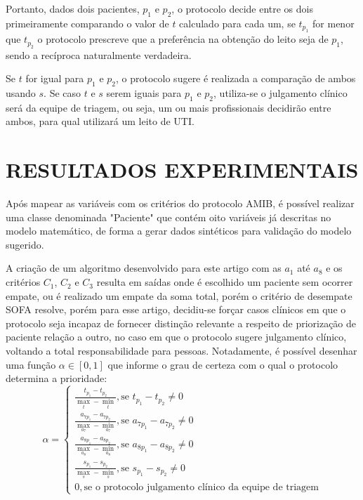 \documentclass[12pt]{article}
\begin{document}
Portanto, dados dois pacientes, $p_1$ e $p_2$, o protocolo decide entre os dois primeiramente comparando o valor de $t$ calculado para cada um, se  $t_{p_1}$ for menor que $t_{p_2}$ o protocolo prescreve que a preferência na obtenção do leito seja de $p_1$, sendo a recíproca naturalmente verdadeira.

Se $t$ for igual para $p_1$ e $p_2$, o protocolo sugere é realizada a comparação de ambos usando $s$. Se caso $t$ e $s$ serem iguais para $p_1$ e $p_2$, utiliza-se o julgamento clínico será da equipe de triagem, ou seja, um ou mais profissionais decidirão entre ambos, para qual utilizará um leito de UTI.


\section{RESULTADOS EXPERIMENTAIS}

Após mapear as variáveis com os critérios do protocolo AMIB, é possível realizar uma classe denominada "Paciente" que contém oito variáveis já descritas no modelo matemático, de forma a gerar dados sintéticos para validação do modelo sugerido.

A criação de um algoritmo desenvolvido para este artigo com as $a_1$ até $a_8$ e os critérios $C_1$, $C_2$ e $C_3$ resulta em saídas onde é escolhido um paciente sem ocorrer empate, ou é realizado um empate da soma total, porém o critério de desempate SOFA resolve, porém para esse artigo, decidiu-se forçar casos clínicos em que o protocolo seja incapaz de fornecer distinção relevante a respeito de priorização de paciente relação a outro, no caso em que o protocolo sugere julgamento clínico, voltando a total responsabilidade para pessoas.
Notadamente, é possível desenhar uma função $\alpha \in [0, 1]$ que informe o grau de certeza com o qual o protocolo determina a prioridade:
\[
\alpha = \begin{cases}
    \frac{t_{p_1} - t_{p_2}}{\max_t - \min_t}, \text{se } t_{p_1} - t_{p_2} \neq 0 \\
    \frac{a_{7p_1} - a_{7p_2}}{\max_{a_7} - \min_{a_7}}, \text{se } a_{7p_1} - a_{7p_2} \neq 0 \\
    \frac{a_{8p_1} - a_{8p_2}}{\max_{a_8} - \min_{a_8}}, \text{se } a_{8p_1} - a_{8p_2} \neq 0 \\
    \frac{s_{p_1} - s_{p_2}}{\max_s - \min_s}, \text{se } s_{p_1} - s_{p_2} \neq 0 \\
    0, \text{se o protocolo julgamento clínico da equipe de triagem}
\end{cases}
\] 
\end{document}
